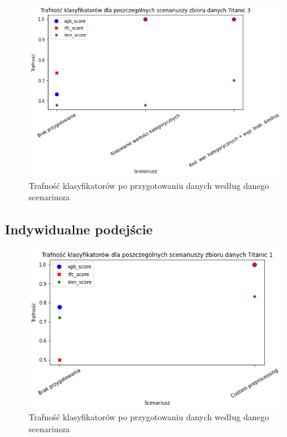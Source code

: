 \documentclass{book}
\begin{document}
\begin{figure}[H]
\centerline{\includegraphics[scale=0.5]{Titanic_3_Kodowanie}}
\centering
\caption{Trafność klasyfikatorów po przygotowaniu danych 
według danego scenariusza}
\end{figure}

\subsection{Indywidualne podejście}

\begin{figure}[H]
\centerline{\includegraphics[scale=0.5]{Titanic_1_Custom}}
\centering
\caption{Trafność klasyfikatorów po przygotowaniu danych 
według danego scenariusza}
\end{figure}
\end{document}
